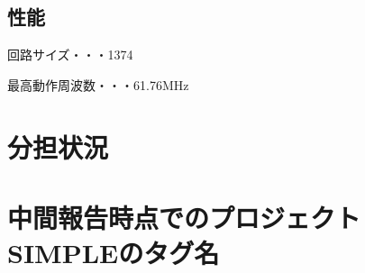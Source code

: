 \documentclass[titlepage]{jsarticle}
\begin{document}
\subsection{性能}

回路サイズ・・・1374

最高動作周波数・・・61.76MHz

\section{分担状況}


\section{中間報告時点でのプロジェクトSIMPLEのタグ名}
\end{document}
